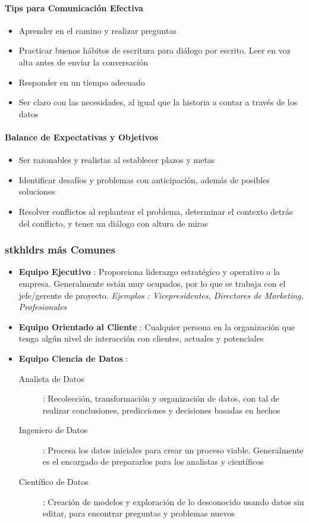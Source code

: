 \paragraph{Tips para Comunicación Efectiva}
\begin{itemize}
    \item {Aprender en el camino y realizar preguntas}
    \item {Practicar buenos hábitos de escritura para diálogo por escrito. Leer en voz alta antes de enviar la conversación}
    \item {Responder en un tiempo adecuado}
    \item {Ser claro con las necesidades, al igual que la historia a contar a través de los datos}
\end{itemize}

\paragraph{Balance de Expectativas y Objetivos}
\begin{itemize}
    \item {Ser razonables y realistas al establecer plazos y metas}
    \item {Identificar desafíos y problemas con anticipación, además de posibles soluciones}
    \item {Resolver conflictos al replantear el problema, determinar el contexto detrás del conflicto, y tener un diálogo con altura de miras}
\end{itemize}

\subsubsection{\gls{stkhldrs} más Comunes}
\begin{itemize}
    \item {\textbf{Equipo Ejecutivo} : Proporciona liderazgo estratégico y operativo a la empresa. Generalmente están muy ocupados, por lo que se trabaja con el jefe/gerente de proyecto. \textit{Ejemplos : Vicepresidentes, Directores de Marketing, Profesionales}}
    \item {\textbf{Equipo Orientado al Cliente} : Cualquier persona en la organización que tenga algún nivel de interacción con clientes, actuales y potenciales}
    \item {\textbf{Equipo Ciencia de Datos} : 
    \begin{description}
        \item[Analista de Datos]{: Recolección, transformación y organización de datos, con tal de realizar conclusiones, predicciones y decisiones basadas en hechos}
        \item[Ingeniero de Datos]{ : Procesa los datos iniciales para crear un proceso viable. Generalmente es el encargado de prepararlos para los analistas y científicos}
        \item[Científico de Datos]{ : Creación de modelos y exploración de lo desconocido usando datos sin editar, para encontrar preguntas y problemas nuevos}
    \end{description}}
\end{itemize}


\newpage